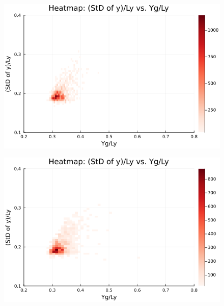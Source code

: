 
\begin{figure}[H]
  \centering
  \includegraphics[scale=0.6]{image/RaRtmap10_heat/2023-12-28T12:38:50.578_map_10times_chi1.265_Ay50_rho0.4_T0.43_dT0.04_Rd0.0_Rt0.0_Ra0.0_g0.0003999718779659611_run4.0e8.png}
  \label{}
\end{figure}

\begin{figure}[H]
  \centering
  \includegraphics[scale=0.6]{image/RaRtmap10_heat/2023-12-28T12:38:51.188_map_10times_chi1.265_Ay50_rho0.4_T0.43_dT0.04_Rd0.0_Rt0.0_Ra0.4693845_g0.0003999718779659611_run4.0e8.png}
  \label{}
\end{figure}

